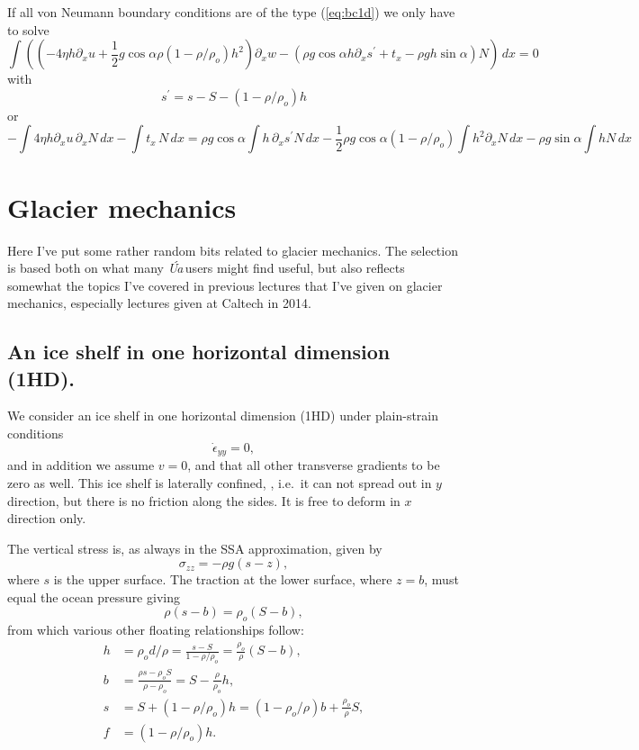 \documentclass[10pt,a4paper]{book}
\newcommand{\p}{\partial}
\newcommand{\eyy}{\dot{\epsilon}_{yy}}
\newcommand{\szz}{\sigma_{zz}}
\newcommand{\Ua}{\textsl{\'Ua}\,}
\begin{document}
If all von Neumann boundary conditions are of the type (\ref{eq:bc1d}) we only have to solve
\[ 
\int (( -4  \eta h \p_x u +\frac{1}{2} g \cos \alpha \rho (1-\rho/\rho_o)  h^2) \p_x w
 - (\rho g \cos \alpha h \p_x s^{'} + t_x - \rho g h \sin \alpha ) N )\, dx =0
\]
with
\[ s^{'} = s-S-(1-\rho/\rho_o) h\]
or
\[
- \int 4 \eta h \p_x u \, \p_x N \, dx - \int t_x \, N \, dx
=\rho g \cos \alpha \int h \, \p_x s^{'} N \, dx - \frac{1}{2} \rho g \cos \alpha (1-\rho/\rho_o)
\int h^2 \p_x N \, dx 
- \rho g \sin \alpha \int h N \, dx
\]


\part{Glacier mechanics}

Here I've put some rather random bits related to glacier
mechanics. The selection is based both on what many \Ua users might
find useful, but also reflects somewhat the topics I've covered in
previous lectures that I've given on glacier mechanics, especially
lectures given at Caltech in 2014.

\chapter{An ice shelf in one horizontal dimension (1HD).}

We consider an ice shelf in one horizontal dimension (1HD) under
plain-strain conditions
\[
\eyy=0 ,
\]
and in addition we assume $v=0$, and that all other transverse
gradients to be zero as well. This ice shelf is laterally confined, ,
i.e.\ it can not spread out in $y$ direction, but there is no
friction along the sides. It is free to deform in $x$ direction only.

The vertical stress is, as always in the SSA approximation, given by
\begin{equation}
\szz= -\rho g (s-z),
\label{eq:szz}
\end{equation}
where $s$ is the upper surface. The traction at the lower surface,
where $z=b$, must equal the ocean pressure giving
\[
\rho (s-b) = \rho_o (S-b) ,
\]
from which various other floating relationships follow:
\begin{align} 
h &= \rho_o d /\rho =\frac{s-S}{1-\rho/\rho_o} = \frac{\rho_o}{\rho} (S-b) ,\label{eq:hs1b} \\
b &= \frac{\rho s - \rho_o S}{\rho-\rho_o}  = S-\frac{\rho}{\rho_o} h , \label{eq:bh1b}\\
s &= S+(1-\rho/\rho_o) h = (1-\rho_o/\rho) b +\frac{\rho_o}{\rho} S, \label{eq:sb2b}\\
f&= (1-\rho/\rho_o) h  . \label{eq:f2}
\end{align}
\end{document}
